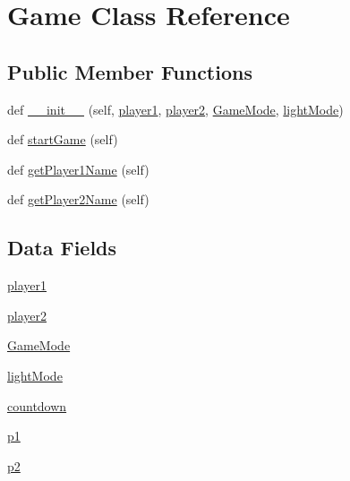 \hypertarget{classgame_1_1game_1_1_game}{}\section{Game Class Reference}
\label{classgame_1_1game_1_1_game}
\subsection*{Public Member Functions}
\begin{DoxyCompactItemize}
\item 
def \hyperlink{classgame_1_1game_1_1_game_a84a2c5df02ca5f02dc12bfec660ad82a}{\+\_\+\+\_\+init\+\_\+\+\_\+} (self, \hyperlink{classgame_1_1game_1_1_game_a5386ee402dfe77ffb134697b75f81e26}{player1}, \hyperlink{classgame_1_1game_1_1_game_a49f9ad8e7cfbcb84c2669fb43958df42}{player2}, \hyperlink{classgame_1_1game_1_1_game_aaf5ef5a17b53e9997c837b07015589de}{Game\+Mode}, \hyperlink{classgame_1_1game_1_1_game_a68bcdfccc99b6ac8189450754da36f78}{light\+Mode})
\item 
def \hyperlink{classgame_1_1game_1_1_game_aa78d70ae2aafa130eaa143ce55887aff}{start\+Game} (self)
\item 
def \hyperlink{classgame_1_1game_1_1_game_aed504f4752749c9ca28461f4628ae5c3}{get\+Player1\+Name} (self)
\item 
def \hyperlink{classgame_1_1game_1_1_game_acd678d3a250de66662badf84935e5ffb}{get\+Player2\+Name} (self)
\end{DoxyCompactItemize}
\subsection*{Data Fields}
\begin{DoxyCompactItemize}
\item 
\hyperlink{classgame_1_1game_1_1_game_a5386ee402dfe77ffb134697b75f81e26}{player1}
\item 
\hyperlink{classgame_1_1game_1_1_game_a49f9ad8e7cfbcb84c2669fb43958df42}{player2}
\item 
\hyperlink{classgame_1_1game_1_1_game_aaf5ef5a17b53e9997c837b07015589de}{Game\+Mode}
\item 
\hyperlink{classgame_1_1game_1_1_game_a68bcdfccc99b6ac8189450754da36f78}{light\+Mode}
\item 
\hyperlink{classgame_1_1game_1_1_game_acb971b832c5f8a89e9995caaee26a1df}{countdown}
\item 
\hyperlink{classgame_1_1game_1_1_game_aa850ae5126b39a75859039aa84c3a577}{p1}
\item 
\hyperlink{classgame_1_1game_1_1_game_a9099c7c12dde5f81f4d3ce261da3637c}{p2}
\end{DoxyCompactItemize}


